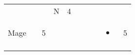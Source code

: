 \documentclass[12pt]{article}
\begin{document}
\begin{longtable}[]{@{}llllllllll@{}}
\begin{minipage}[t]{0.06\columnwidth}\raggedright\strut
\strut\end{minipage} &
\begin{minipage}[t]{0.06\columnwidth}\raggedright\strut
\strut\end{minipage} &
\begin{minipage}[t]{0.06\columnwidth}\raggedright\strut
\strut\end{minipage} &
\begin{minipage}[t]{0.07\columnwidth}\raggedright\strut
N
\strut\end{minipage} &
\begin{minipage}[t]{0.08\columnwidth}\raggedright\strut
4
\strut\end{minipage}\tabularnewline
\begin{minipage}[t]{0.13\columnwidth}\raggedright\strut
Mage
\strut\end{minipage} &
\begin{minipage}[t]{0.06\columnwidth}\raggedright\strut
\strut\end{minipage} &
\begin{minipage}[t]{0.06\columnwidth}\raggedright\strut
5
\strut\end{minipage} &
\begin{minipage}[t]{0.06\columnwidth}\raggedright\strut
\strut\end{minipage} &
\begin{minipage}[t]{0.06\columnwidth}\raggedright\strut
\strut\end{minipage} &
\begin{minipage}[t]{0.06\columnwidth}\raggedright\strut
\strut\end{minipage} &
\begin{minipage}[t]{0.06\columnwidth}\raggedright\strut
\strut\end{minipage} &
\begin{minipage}[t]{0.06\columnwidth}\raggedright\strut
\strut\end{minipage} &
\begin{minipage}[t]{0.07\columnwidth}\raggedright\strut
\begin{itemize}
\item
\end{itemize}
\strut\end{minipage} &
\begin{minipage}[t]{0.08\columnwidth}\raggedright\strut
5
\strut\end{minipage}\tabularnewline
\begin{minipage}[t]{0.13\columnwidth}\raggedright\strut

\end{minipage}
\end{longtable}
\end{document}
